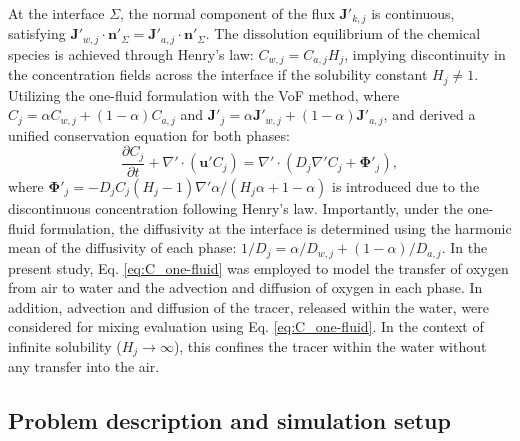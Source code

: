 \documentclass[final,3p,times,twocolumn,authoryear]{elsarticle}
\theoremstyle{definition}
\begin{document}
At the interface $\Sigma$, the normal component of the flux $\mathbf{J}'_{k,j}$ is continuous, satisfying $\mathbf{J}'_{w,j}\cdot \mathbf{n}'_\Sigma = \mathbf{J}'_{a,j} \cdot \mathbf{n}'_\Sigma$. The dissolution equilibrium of the chemical species is achieved through Henry's law: $C_{w,j}=C_{a,j}H_j$, implying discontinuity in the concentration fields across the interface if the solubility constant $H_j \neq 1$. Utilizing the one-fluid formulation with the VoF method, where $C_j = \alpha C_{w,j} + (1-\alpha)C_{a,j}$ and $\mathbf{J}'_j = \alpha\mathbf{J}'_{w,j} + (1-\alpha)\mathbf{J}'_{a,j}$, \citet{Haroun2010} and \citet{Farsoiya2021} derived a unified conservation equation for both phases:
\begin{equation}
    \frac{\partial C_j}{\partial t} + \nabla' \cdot \left( \mathbf{u}' C_j \right) = \nabla' \cdot \left(D_j\nabla' C_j + \mathbf{\Phi}'_j \right), \label{eq:C_one-fluid}
\end{equation}
where $\mathbf{\Phi}'_j = - D_j C_j(H_j-1)\nabla' \alpha/(H_j\alpha + 1-\alpha)$ is introduced due to the discontinuous concentration following Henry's law. Importantly, under the one-fluid formulation, the diffusivity at the interface is determined using the harmonic mean of the diffusivity of each phase: $1/D_j = \alpha/D_{w,j} + (1-\alpha)/D_{a,j}$. In the present study, Eq. \eqref{eq:C_one-fluid} was employed to model the transfer of oxygen from air to water and the advection and diffusion of oxygen in each phase. In addition, advection and diffusion of the tracer, released within the water, were considered for mixing evaluation using Eq. \eqref{eq:C_one-fluid}. In the context of infinite solubility ($H_j \rightarrow \infty$), this confines the tracer within the water without any transfer into the air.

\subsection{Problem description and simulation setup}
\end{document}
